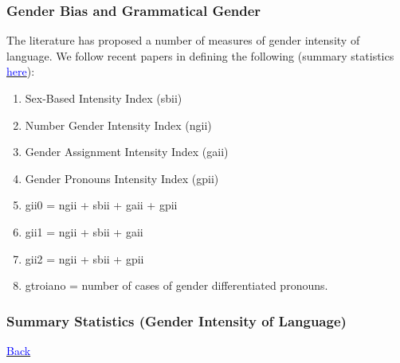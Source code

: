 \documentclass[9pt,letterpaper,subeqn]{beamer}
\begin{document}
\begin{frame}[label=GenderLanguage]
\frametitle{Gender Bias and Grammatical Gender}
The literature has proposed a number of measures of gender intensity of language.
We follow recent papers in defining the following (summary statistics \hyperlink{GenderLanguageSum}{\textcolor{blue}{here}}): \vspace{4mm}
\begin{enumerate}
\item Sex-Based Intensity Index (sbii) 
\item Number Gender Intensity Index (ngii)
\item Gender Assignment Intensity Index (gaii) 
\item Gender Pronouns Intensity Index (gpii) 
\item gii0 = ngii + sbii + gaii + gpii
\item gii1 = ngii + sbii + gaii
\item gii2 = ngii + sbii + gpii
\item gtroiano = number of cases of gender differentiated pronouns.
\end{enumerate}
\end{frame}

\begin{frame}[label=GenderLanguageSum]
\frametitle{Summary Statistics (Gender Intensity of Language)}
  \begin{table}[htbp]\centering 
\caption{Summary statistics \label{sumstat}}
\end{table}
\hyperlink{GenderLanguage}{\textcolor{blue}{Back}}
\end{frame}
\end{document}

